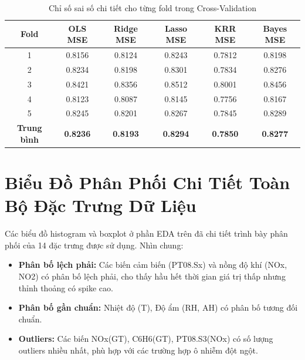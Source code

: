 \documentclass[12pt,a4paper]{report}
\newcommand{\theadcolor}{\rowcolor{tableheader}}
\begin{document}
\begin{center}
\begin{table}[H]
\centering
\caption{Chỉ số sai số chi tiết cho từng fold trong Cross-Validation}
\label{table:cv_details}
\begin{tabular}{|c|c|c|c|c|c|}
\hline
\theadcolor \textbf{Fold} & \textbf{OLS MSE} & \textbf{Ridge MSE} & \textbf{Lasso MSE} & \textbf{KRR MSE} & \textbf{Bayes MSE} \\
\hline
1 & 0.8156 & 0.8124 & 0.8243 & 0.7812 & 0.8198 \\
\hline
2 & 0.8234 & 0.8198 & 0.8301 & 0.7834 & 0.8276 \\
\hline
3 & 0.8421 & 0.8356 & 0.8512 & 0.8001 & 0.8456 \\
\hline
4 & 0.8123 & 0.8087 & 0.8145 & 0.7756 & 0.8167 \\
\hline
5 & 0.8245 & 0.8201 & 0.8267 & 0.7845 & 0.8289 \\
\hline
\textbf{Trung bình} & \textbf{0.8236} & \textbf{0.8193} & \textbf{0.8294} & \textbf{0.7850} & \textbf{0.8277} \\
\hline
\end{tabular}
\end{table}
\end{center}
 
\section{Biểu Đồ Phân Phối Chi Tiết Toàn Bộ Đặc Trưng Dữ Liệu}
 
Các biểu đồ histogram và boxplot ở phần EDA trên đã chi tiết trình bày phân phối của 14 đặc trưng được sử dụng. Nhìn chung:
 
\begin{itemize}
    \item \textbf{Phân bố lệch phải:} Các biến cảm biến (PT08.Sx) và nồng độ khí (NOx, NO2) có phân bố lệch phải, cho thấy hầu hết thời gian giá trị thấp nhưng thỉnh thoảng có spike cao.
    \item \textbf{Phân bố gần chuẩn:} Nhiệt độ (T), Độ ẩm (RH, AH) có phân bố tương đối chuẩn.
    \item \textbf{Outliers:} Các biến NOx(GT), C6H6(GT), PT08.S3(NOx) có số lượng outliers nhiều nhất, phù hợp với các trường hợp ô nhiễm đột ngột.
\end{itemize}
 
\end{document}
